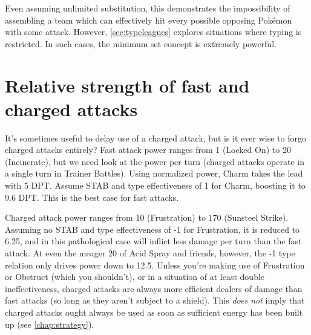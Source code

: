 Even assuming unlimited substitution, this demonstrates the
  impossibility of assembling a team which can effectively
  hit every possible opposing Pokémon with some attack.
However, \autoref{sec:typeleagues} explores situations where typing is restricted.
In such cases, the minimum set concept is extremely powerful.

\section{Relative strength of fast and charged attacks}
\label{sec:fastvchaged}
It's sometimes useful to delay use of a charged attack, but is it ever wise to forgo
  charged attacks entirely?
Fast attack power ranges from 1 (Locked On) to 20 (Incinerate), but we need look at
  the power per turn (charged attacks operate in a single turn in Trainer Battles).
Using normalized power, Charm takes the lead with 5 DPT\@.
Assume STAB and type effectiveness of 1 for Charm, boosting it to 9.6 DPT\@.
This is the best case for fast attacks.

Charged attack power ranges from 10 (Frustration) to 170 (Sunsteel Strike).
Assuming no STAB and type effectiveness of -1 for Frustration, it is reduced to 6.25,
  and in this pathological case will inflict less damage per turn than the fast attack.
At even the meager 20 of Acid Spray and friends, however, the -1 type relation only
  drives power down to 12.5.
Unless you're making use of Frustration or Obstruct (which you shouldn't),
  or in a situation of at least double ineffectiveness, charged attacks are
  always more efficient dealers of damage than fast attacks (so long
  as they aren't subject to a shield).
This \textit{does not} imply that charged attacks ought always be used as soon as
  sufficient energy has been built up (see \autoref{chap:strategy}).
